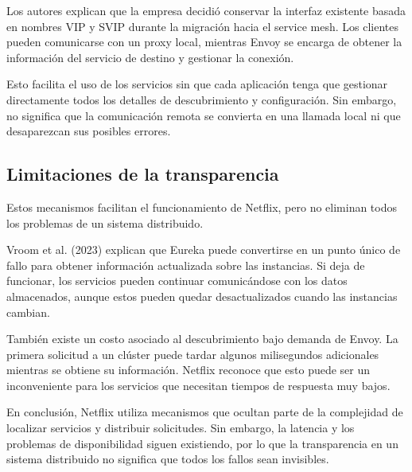 Los autores explican que la empresa decidió conservar la interfaz existente basada en nombres VIP y SVIP durante la migración hacia el service mesh. Los clientes pueden comunicarse con un proxy local, mientras Envoy se encarga de obtener la información del servicio de destino y gestionar la conexión.

Esto facilita el uso de los servicios sin que cada aplicación tenga que gestionar directamente todos los detalles de descubrimiento y configuración. Sin embargo, no significa que la comunicación remota se convierta en una llamada local ni que desaparezcan sus posibles errores.

\subsection{Limitaciones de la transparencia}

Estos mecanismos facilitan el funcionamiento de Netflix, pero no eliminan todos los problemas de un sistema distribuido.

Vroom et al. (2023) explican que Eureka puede convertirse en un punto único de fallo para obtener información actualizada sobre las instancias. Si deja de funcionar, los servicios pueden continuar comunicándose con los datos almacenados, aunque estos pueden quedar desactualizados cuando las instancias cambian.

También existe un costo asociado al descubrimiento bajo demanda de Envoy. La primera solicitud a un clúster puede tardar algunos milisegundos adicionales mientras se obtiene su información. Netflix reconoce que esto puede ser un inconveniente para los servicios que necesitan tiempos de respuesta muy bajos.

En conclusión, Netflix utiliza mecanismos que ocultan parte de la complejidad de localizar servicios y distribuir solicitudes. Sin embargo, la latencia y los problemas de disponibilidad siguen existiendo, por lo que la transparencia en un sistema distribuido no significa que todos los fallos sean invisibles.

\parencite{vroom2023mesh}
